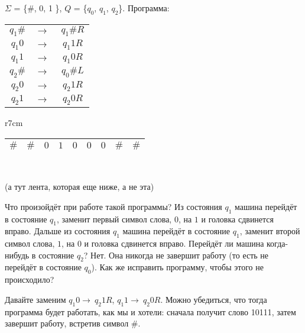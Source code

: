 \begin{example}
	\par $\Sigma$ = \{\#, 0, 1 \}, $Q$ = \{$q_{0}$, $q_{1}$, $q_{2}$\}.  Программа:
	\par
	\begin{tabular}{ c c c} 
		$q_{1}\#$ & $\to\ $& $q_{1}\#R$ \\ $q_{1}0$ & $\to\ $& $q_{1}1R$ \\ $q_{1}1$ & $\to\ $& $q_{1}0R$ \\ $q_{2}\#$ & $\to\ $&
		$q_{0}\#L$ \\ $q_{2}0$ & $\to\ $& $q_{2}1R$ \\ $q_{2}1$ & $\to\ $& $q_{2}0R$ \\ 
	\end{tabular}
	\par
	\begin{wraptable}{r}{7cm}
		\begin{tabular}{ c|c|c|c|c|c|c|c|c } 
			\hline
			$\#$ & $\#$ & $0$  & $1$ & $0$ & $0$ & $0$ & $\#$ & $\#$ \\  \hline
		\end{tabular}
		\\
	\end{wraptable}

	(а тут лента, которая еще ниже, а не эта)

	\par Что произойдёт при работе такой программы?  Из состояния $q_{1}$ машина перейдёт в состояние $q_{1}$, заменит
	первый символ слова, $0$, на $1$ и головка сдвинется вправо. Дальше из состояния $q_{1}$ машина перейдёт в
	состояние $q_{1}$, заменит второй символ слова, $1$, на $0$ и головка сдвинется вправо. Перейдёт ли машина
	когда-нибудь в состояние $q_{2}$? Нет. Она никогда не завершит работу (то есть не перейдёт в состояние
	$q_{0}$). Как же исправить программу, чтобы этого не происходило? 
	\par Давайте заменим $q_{1}0 \to\ q_{2}1R$, $q_{1}1 \to\ q_{2}0R$. Можно убедиться, что тогда программа будет
	работать, как мы и хотели: сначала получит слово 10111, затем завершит работу, встретив символ $\#$.
\end{example}
